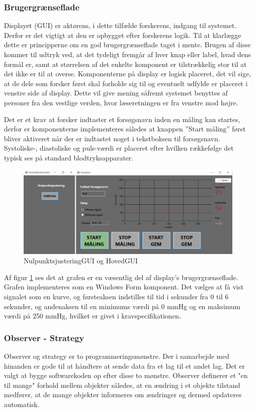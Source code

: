 \subsubsection{Brugergrænseflade}
Displayet (GUI) er aktørens, i dette tilfælde forskerens, indgang til systemet. Derfor er det vigtigt at den er opbygget efter forskerens logik. Til at klarlægge dette er principperne om en god brugergrænseflade taget i mente. Brugen af disse kommer til udtryk ved, at det tydeligt fremgår af hver knap eller label, hvad dens formål er, samt at størrelsen af det enkelte komponent er tilstrækkelig stor til at det ikke er til at overse. Komponenterne på display er logisk placeret, det vil sige, at de dele som forsker først skal forholde sig til og eventuelt udfylde er placeret i venstre side af display. Dette vil give mening såfremt systemet benyttes af personer fra den vestlige verden, hvor læseretningen er fra venstre mod højre. 

Det er et krav at forsker indtaster et forsøgsnavn inden en måling kan startes, derfor er komponenterne implementeres således at knappen ”Start måling” først bliver aktiveret når der er indtastet noget i tekstboksen til forsøgsnavn. Systoliske-, diastoliske og puls-værdi er placeret efter hvilken rækkefølge det typisk ses på standard blodtryksapparater. 
\begin{figure}[H]
	\centering
	\includegraphics[width=1.0\textwidth]{Figurer/NulHovedGUI}
	\caption{NulpunktsjusteringGUI og HovedGUI}
	\label{fig:FormsSW}
\end{figure}
Af figur \ref{fig:FormsSW} ses det at grafen er en væsentlig del af display’s brugergrænseflade. Grafen implementeres som en Windows Form komponent. Det vælges at få vist signalet som en kurve, og førsteaksen indstilles til tid i sekunder fra 0 til 6 sekunder, og andenaksen til en minimums værdi på 0 mmHg og en maksimum værdi på 250 mmHg, hvilket er givet i kravspecifikationen. 

\subsubsection{Observer - Strategy}
Observer og strategy er to programmeringsmønstre. Der i samarbejde med hinanden er gode til at håndtere at sende data fra et lag til et andet lag. Det er valgt at bygge softwarekoden op efter disse to mønstre. Observer definerer et "en til mange"  forhold mellem objekter således, at en ændring i et objekts tilstand medfører, at de mange objekter informeres om ændringer og dermed opdateres automatisk.

